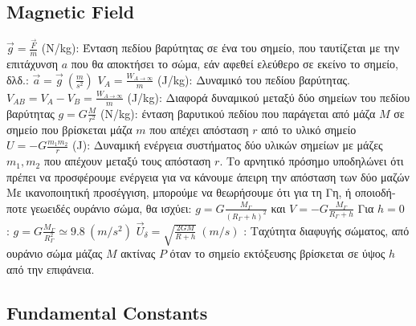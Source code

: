 \documentclass[12pt]{article}
\begin{document}
\begin{flushleft}
	\subsection{Magnetic Field}
	
	\textbullet \quad $\displaystyle \vec{g} = \frac{\vec{F}}{m} $ (N/kg): \textgreek{Ένταση πεδίου βαρύτητας σε ένα του σημείο, που ταυτίζεται με την επιτάχυνση} $a$ \textgreek{που θα αποκτήσει το σώμα, εάν αφεθεί ελεύθερο σε εκείνο το σημείο, δλδ.}: $\vec{a} = \vec{g} \ (\frac{m}{s^2}) $ \linebreak 
	\textbullet \quad $\displaystyle V_A = \frac{W_{A\to \infty}}{m} $ (J/kg): \textgreek{Δυναμικό του πεδίου βαρύτητας}. \linebreak 
	\textbullet \quad $\displaystyle V_{AB} = V_A - V_B = \frac{W_{A\to \infty}}{m} $ (J/kg): \textgreek{Διαφορά δυναμικού μεταξύ δύο σημείων του πεδίου βαρύτητας} \linebreak 
	\textbullet \quad $\displaystyle g= G \frac{M}{r^2}$ (N/kg): \textgreek{ένταση βαρυτικού πεδίου που παράγεται από μάζα} $M$ \textgreek{σε σημείο που βρίσκεται μάζα} $m$ \textgreek{που απέχει απόσταση} $r$ \textgreek{από το υλικό σημείο} \linebreak 
	\textbullet \quad $\displaystyle U = -G\frac{m_1m_2}{r} $ (J): \textgreek{Δυναμική ενέργεια συστήματος δύο υλικών σημείων με μάζες} $m_1, m_2$ \textgreek{που απέχουν μεταξύ τους απόσταση} $r$. \textgreek{Το αρνητικό πρόσημο υποδηλώνει ότι πρέπει να προσφέρουμε ενέργεια για να κάνουμε άπειρη την απόσταση των δύο μαζών} \linebreak 
	\textbullet \quad \textgreek{Με ικανοποιητική προσέγγιση, μπορούμε να θεωρήσουμε ότι για τη Γη, ή οποιοδήποτε γεωειδές ουράνιο σώμα, θα ισχύει: } \linebreak 
	$\displaystyle g= G \frac{M_{\Gamma}}{(R_{\Gamma} +h)^2} $ \textgreek{και} $V = -G \frac{M_{\Gamma}}{R_{\Gamma} + h} $ \linebreak 
	\textgreek{Για} $\displaystyle h = 0$  :  $g = G \frac{M_{\Gamma}}{R_{\Gamma}^2} \simeq 9.8 \ (m/s^2)$ \linebreak 
	\textbullet \quad $\displaystyle \vec{U}_{\delta} = \sqrt{\frac{2GM}{R+h}} \ (m/s)$  :  \textgreek{Ταχύτητα διαφυγής σώματος, από ουράνιο σώμα μάζας} $M$ \textgreek{ακτίνας} $P$ \textgreek{όταν το σημείο εκτόξευσης βρίσκεται σε ύψος} $h$ \textgreek{από την επιφάνεια}. \linebreak 
	
	
	\subsection{Fundamental Constants}
	

\end{flushleft}
\end{document}
